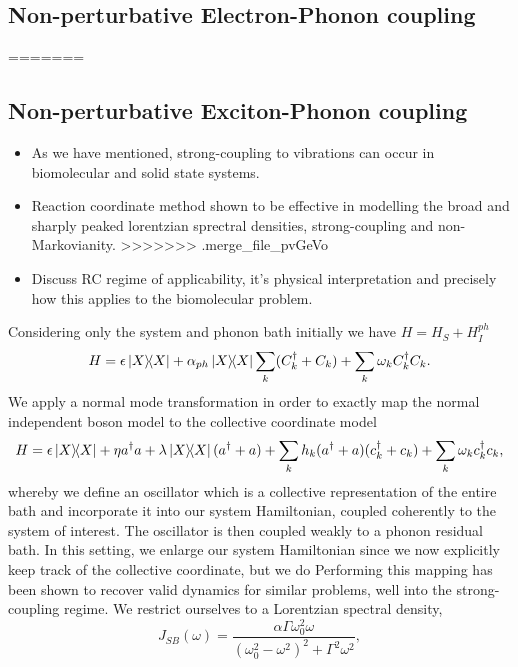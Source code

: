 \documentclass[]{article}
\begin{document}
\begin{itemize}
\section{Non-perturbative Electron-Phonon coupling}
\begin{itemize}
=======
\section{Non-perturbative Exciton-Phonon coupling}
\begin{itemize}
	\item As we have mentioned, strong-coupling to vibrations can occur in biomolecular and solid state systems.
	\item Reaction coordinate method shown to be effective in modelling the broad and sharply peaked lorentzian sprectral densities, strong-coupling and non-Markovianity.
>>>>>>> .merge_file_pvGeVo
	\item Discuss RC regime of applicability, it's physical interpretation and precisely how this applies to the biomolecular problem.
\end{itemize}

 Considering only the system and phonon bath initially we have $H = H_S + H_I^{ph}$
\begin{equation}
H = \epsilon \dyad{X} + \alpha_{ph}\dyad{X}\sum_{k}(C^{\dagger}_k+C_k) + \sum_{k}\omega_k C^{\dagger}_k C_k.
\end{equation}
We apply a normal mode transformation in order to exactly map the normal independent boson model to the collective coordinate model
\begin{equation}
H = \epsilon \dyad{X} + \eta a^{\dagger}a + \lambda\dyad{X}(a^{\dagger}+a) + \sum_{k}h_k(a^{\dagger}+a)(c^{\dagger}_k+c_k) + \sum_{k}\omega_k c^{\dagger}_k c_k,
\end{equation}
whereby we define an oscillator which  is a collective representation of the entire bath and incorporate it into our system Hamiltonian, coupled coherently to the system of interest. The oscillator is then coupled weakly to a phonon residual bath. In this setting, we enlarge our system Hamiltonian since we now explicitly keep track of the collective coordinate, but we do Performing this mapping has been shown to recover valid dynamics for similar problems, well into the strong-coupling regime.
We restrict ourselves to a Lorentzian spectral density, 
\begin{equation}
\label{eq:DrudeLorentzUnderdamped}
J_{SB}(\omega) = \frac{\alpha \Gamma \omega_0^2\omega}{(\omega_0^2-\omega^2)^2 + \Gamma^2\omega^2},
\end{equation}


\end{itemize}
\end{itemize}
\end{document}
